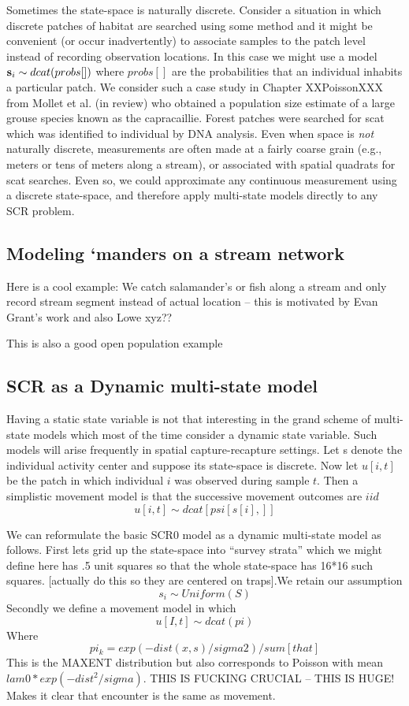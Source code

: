 {Sometimes the state-space is naturally discrete. Consider a
situation in which discrete patches of habitat are searched using some
method and it might be convenient (or occur inadvertently) to
associate samples to the patch level instead of recording observation
locations. In this case we might use a model ${\bf s}_{i} 
\sim dcat(probs[])$
where $probs[]$ are the probabilities that an individual inhabits a
particular patch. We consider such a case study in Chapter
XXPoissonXXX from Mollet et al. (in review) who obtained a population
size estimate of a large grouse species known as the
capracaillie. Forest patches were searched for scat which was
identified to individual by DNA analysis. Even when space is {\it not}
naturally discrete, measurements are often made at a fairly coarse
grain (e.g., meters or tens of meters along a stream), or associated
with spatial quadrats for scat searches. Even so, we could approximate
any continuous measurement using a discrete state-space, and therefore
apply multi-state models directly to any SCR problem.




\subsection{Modeling ‘manders on a stream network}

Here is a cool example: We catch salamander’s or fish along a stream
and only record stream segment instead of actual location – this is
motivated by Evan Grant’s work and also Lowe xyz??

This is also a good open population example

\subsection{SCR as a Dynamic multi-state model}

Having a static state variable is not that interesting in the grand
scheme of multi-state models which most of the time consider a dynamic
state variable. Such models will arise frequently in spatial
capture-recapture settings. Let s denote the individual activity
center and suppose its state-space is discrete.  Now let $u[i,t]$ be
the patch in which individual $i$ was observed during sample $t$. Then
a simplistic movement model is that the successive movement outcomes
are $iid$
\[
u[i,t] \sim  dcat[ psi[s[i],] ]
\]

We can reformulate the basic SCR0 model as a dynamic multi-state model
as follows.  First lets grid up the state-space into “survey strata”
which we might define here has .5 unit squares so that the whole
state-space has 16*16 such squares. [actually do this so they are
centered on traps].We retain our assumption
\[
 s_{i} \sim Uniform(S)
\]
Secondly we define a movement model in which
\[
u[I,t] \sim dcat(pi)
\]
Where
\[
 pi_{k} = exp(-dist(x,s)/sigma2)/sum[that]
\]
This is the MAXENT distribution but also corresponds to Poisson with
mean $lam0*exp(-dist^2/sigma)$.  THIS IS FUCKING CRUCIAL – THIS IS
HUGE! Makes it clear that encounter is the same as movement.

}
